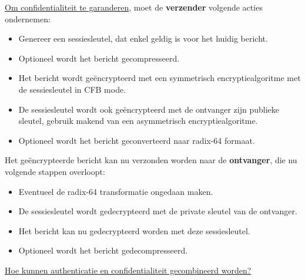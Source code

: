 \documentclass{report}
\begin{document}
	\underline{Om confidentialiteit te garanderen}, moet de \textbf{verzender} volgende acties ondernemen:
	\begin{itemize}
		\item[\info] Genereer een sessiesleutel, dat enkel geldig is voor het huidig bericht.
		\item[\info] Optioneel wordt het bericht gecompresseerd.
		\item[\info] Het bericht wordt geëncrypteerd met een symmetrisch encryptiealgoritme met de sessiesleutel in CFB mode.
		\item[\info] De sessiesleutel wordt ook geëncrypteerd met de ontvanger zijn publieke sleutel, gebruik makend van een asymmetrisch encryptiealgoritme.
		\item[\info] Optioneel wordt het bericht geconverteerd naar radix-64 formaat.
	\end{itemize}
	Het geëncrypteerde bericht kan nu verzonden worden naar de \textbf{ontvanger}, die nu volgende stappen overloopt:
	\begin{itemize}
		\item[\info] Eventueel de radix-64 transformatie ongedaan maken.
		\item[\info] De sessiesleutel wordt gedecrypteerd met de private sleutel van de ontvanger.
		\item[\info] Het bericht kan nu gedecrypteerd worden met deze sessiesleutel.
		\item[\info] Optioneel wordt het bericht gedecompresseerd.
	\end{itemize}

	\underline{Hoe kunnen authenticatie en confidentialiteit gecombineerd worden?}
\end{document}
